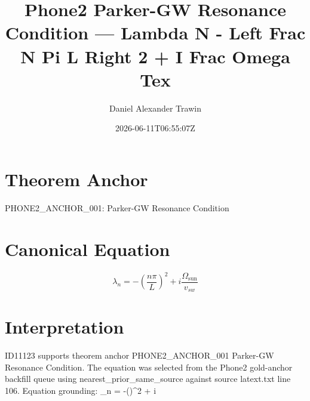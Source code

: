 \documentclass[11pt]{article}
\title{Phone2 Parker-GW Resonance Condition — Lambda N - Left Frac N Pi L Right 2 + I Frac Omega Tex}
\author{Daniel Alexander Trawin}
\date{2026-06-11T06:55:07Z}
\begin{document}
\maketitle
\section*{Theorem Anchor}
PHONE2_ANCHOR_001: Parker-GW Resonance Condition
\section*{Canonical Equation}
\[
\lambda_n = -\left(\frac{n\pi}{L}\right)^2 + i\frac{\Omega_{\text{sun}}}{v_{sw}}
\]
\section*{Interpretation}
ID11123 supports theorem anchor PHONE2_ANCHOR_001 Parker-GW Resonance Condition. The equation was selected from the Phone2 gold-anchor backfill queue using nearest_prior_same_source against source latext.txt line 106. Equation grounding: \lambda_n = -\left(\right)^2 + i
\end{document}
